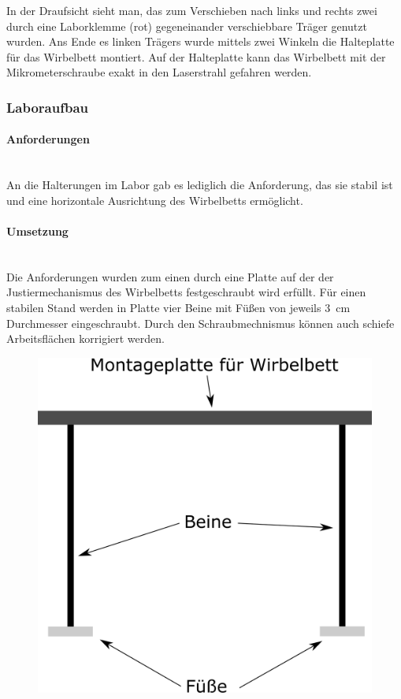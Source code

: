 In der Draufsicht sieht man, das zum Verschieben nach links und rechts zwei durch eine Laborklemme (rot) gegeneinander verschiebbare Träger genutzt wurden. Ans Ende es linken Trägers wurde mittels zwei Winkeln die Halteplatte für das Wirbelbett montiert. Auf der Halteplatte kann das Wirbelbett mit der Mikrometerschraube exakt in den Laserstrahl gefahren werden.


\subsubsection{Laboraufbau}

\paragraph{Anforderungen}
\hfill \\
An die Halterungen im Labor gab es lediglich die Anforderung, das sie stabil ist und eine horizontale Ausrichtung des Wirbelbetts ermöglicht.

\paragraph{Umsetzung}
\hfill \\
Die Anforderungen wurden zum einen durch eine Platte auf der der Justiermechanismus des Wirbelbetts festgeschraubt wird erfüllt. Für einen stabilen Stand werden in Platte vier Beine mit Füßen von jeweils \SI{3}{cm} Durchmesser eingeschraubt. Durch den Schraubmechnismus können auch schiefe Arbeitsflächen korrigiert werden.



\begin{figure}[h]
	\begin{center}
	\includegraphics[scale=0.6]{Halterung_Labor_Seite.png}
    \end{center}
\end{figure}




